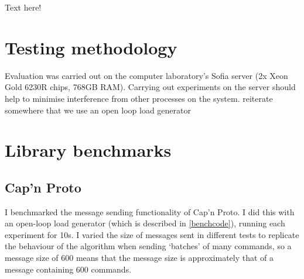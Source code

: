 



Text here!

\section{Testing methodology}
Evaluation was carried out on the computer laboratory's Sofia server (2x Xeon Gold 6230R chips, 768GB RAM). Carrying out experiments on the server should help to minimise interference from other processes on the system.
reiterate somewhere that we use an open loop load generator

\section{Library benchmarks}
\subsection{Cap'n Proto} \label{capnpbenchmark}
I benchmarked the message sending functionality of Cap'n Proto. I did this with an open-loop load generator (which is described in \ref{benchcode}), running each experiment for 10s. I varied the size of messages sent in different tests to replicate the behaviour of the algorithm when sending `batches' of many commands, so a message size of 600 means that the message size is approximately that of a message containing 600 commands.

